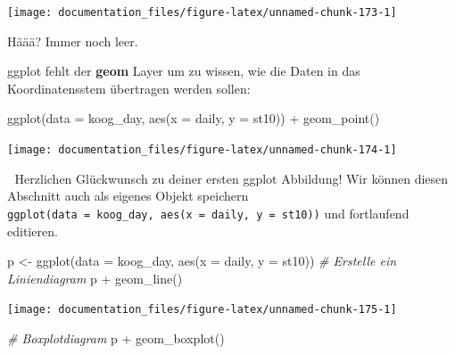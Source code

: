 \documentclass[
]{article}
\newenvironment{Shaded}{\begin{snugshade}}{\end{snugshade}}
\newcommand{\AttributeTok}[1]{\textcolor[rgb]{0.77,0.63,0.00}{#1}}
\newcommand{\CommentTok}[1]{\textcolor[rgb]{0.56,0.35,0.01}{\textit{#1}}}
\newcommand{\FunctionTok}[1]{\textcolor[rgb]{0.00,0.00,0.00}{#1}}
\newcommand{\NormalTok}[1]{#1}
\newcommand{\OtherTok}[1]{\textcolor[rgb]{0.56,0.35,0.01}{#1}}
\newcommand{\SpecialCharTok}[1]{\textcolor[rgb]{0.00,0.00,0.00}{#1}}
\begin{document}
\begin{center}\texttt{[image: documentation\_files/figure-latex/unnamed-chunk-173-1]} \end{center}

Häää? Immer noch leer.

ggplot fehlt der \textbf{geom} Layer um zu wissen, wie die Daten in das Koordinatensstem übertragen werden sollen:

\begin{Shaded}
\begin{Highlighting}[]
\FunctionTok{ggplot}\NormalTok{(}\AttributeTok{data =}\NormalTok{ koog\_day, }\FunctionTok{aes}\NormalTok{(}\AttributeTok{x =}\NormalTok{ daily, }\AttributeTok{y =}\NormalTok{ st10)) }\SpecialCharTok{+}
  \FunctionTok{geom\_point}\NormalTok{()}
\end{Highlighting}
\end{Shaded}

\begin{center}\texttt{[image: documentation\_files/figure-latex/unnamed-chunk-174-1]} \end{center}

🎉 Herzlichen Glückwunsch zu deiner ersten ggplot Abbildung! Wir können diesen Abschnitt auch als eigenes Objekt speichern \texttt{ggplot(data\ =\ koog\_day,\ aes(x\ =\ daily,\ y\ =\ st10))} und fortlaufend editieren.

\begin{Shaded}
\begin{Highlighting}[]
\NormalTok{p }\OtherTok{\textless{}{-}} \FunctionTok{ggplot}\NormalTok{(}\AttributeTok{data =}\NormalTok{ koog\_day, }\FunctionTok{aes}\NormalTok{(}\AttributeTok{x =}\NormalTok{ daily, }\AttributeTok{y =}\NormalTok{ st10))}
\CommentTok{\# Erstelle ein Liniendiagram}
\NormalTok{p }\SpecialCharTok{+} \FunctionTok{geom\_line}\NormalTok{()}
\end{Highlighting}
\end{Shaded}

\begin{center}\texttt{[image: documentation\_files/figure-latex/unnamed-chunk-175-1]} \end{center}

\begin{Shaded}
\begin{Highlighting}[]
\CommentTok{\# Boxplotdiagram}
\NormalTok{p }\SpecialCharTok{+} \FunctionTok{geom\_boxplot}\NormalTok{()}
\end{Highlighting}
\end{Shaded}
\end{document}

